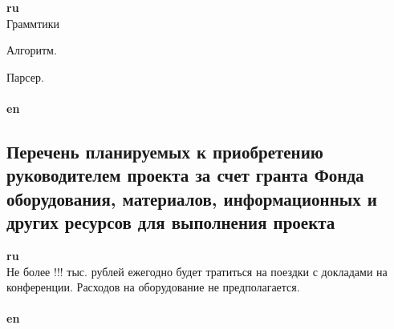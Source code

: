 \documentclass[12pt]{article}  %
\theoremstyle{remark}
\begin{document}
\textbf{ru}\\
Граммтики

Алгоритм.

Парсер.
\\
\\
\textbf{en}\\

\subsection{Перечень планируемых к приобретению руководителем проекта за счет гранта Фонда оборудования, материалов, информационных и других ресурсов для выполнения проекта}

\textbf{ru}\\
Не более !!! тыс. рублей ежегодно будет тратиться на поездки с докладами на конференции. Расходов на оборудование не предполагается.
\\
\\
\textbf{en}\\
\end{document}
